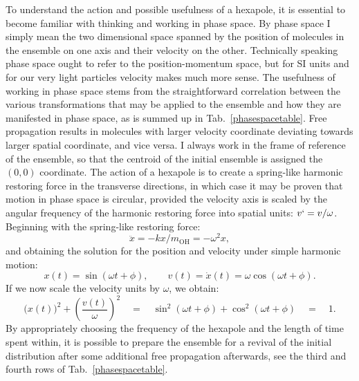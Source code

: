 To understand the action and possible usefulness of a hexapole, it is essential to become familiar with thinking and working in phase space.
By phase space I simply mean the two dimensional space spanned by the position of molecules in the ensemble on one axis and their velocity on the other.
Technically speaking phase space ought to refer to the position-momentum space, but for SI units and for our very light particles velocity makes much more sense.
The usefulness of working in phase space stems from the straightforward correlation between the various transformations that may be applied to the ensemble and how they are manifested in phase space, as is summed up in Tab.~\ref{phasespacetable}.
Free propagation results in molecules with larger velocity coordinate deviating towards larger spatial coordinate, and vice versa.
I always work in the frame of reference of the ensemble, so that the centroid of the initial ensemble is assigned the $(0,0)$ coordinate.
The action of a hexapole is to create a spring-like harmonic restoring force in the transverse directions, in which case it may be proven that motion in phase space is circular, provided the velocity axis is scaled by the angular frequency of the harmonic restoring force into spatial units: $v` = v/\omega$.
Beginning with the spring-like restoring force:
\begin{equation}
\ddot{x} = -kx/m_\text{OH} = -\omega^2x,
\end{equation}
and obtaining the solution for the position and velocity under simple harmonic motion:
\begin{equation}
x(t) = \sin(\omega t + \phi),\qquad v(t) =\dot{x}(t) = \omega\cos(\omega t + \phi).
\end{equation}
If we now scale the velocity units by $\omega$, we obtain:
\begin{equation}
\biggl(x(t)\biggr)^2 + \left(\frac{v(t)}{\omega}\right)^2\quad = \quad\sin^2(\omega t + \phi) + \cos^2(\omega t + \phi)\quad =\quad 1.
\end{equation}
By appropriately choosing the frequency of the hexapole and the length of time spent within, it is possible to prepare the ensemble for a revival of the initial distribution after some additional free propagation afterwards, see the third and fourth rows of Tab.~\ref{phasespacetable}.

